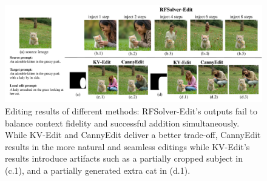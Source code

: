 \documentclass{article}
\begin{document}
\begin{figure}[t]

    \centering
    \includegraphics[width=0.85\linewidth]{figures/cat3.pdf}
      \caption{Editing results of different methods: RFSolver-Edit's outputs fail to balance context fidelity and successful addition simultaneously. While KV-Edit and CannyEdit deliver a better trade-off, CannyEdit results in the more natural and seamless editings while KV-Edit's results introduce artifacts such as a {partially cropped subject} in (c.1), and {a partially generated extra cat} in (d.1).}
    \label{fig2}
\end{figure}
\end{document}
